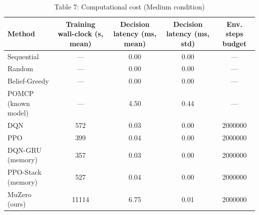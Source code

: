 \begin{table}[htbp]
\centering
\caption{Table 7: Computational cost (Medium condition)}
\begin{tabular}{lcccc}
\toprule
Method & Training wall-clock (s, mean) & Decision latency (ms, mean) & Decision latency (ms, std) & Env. steps budget \\
\midrule
Sequential & — & 0.00 & 0.00 & — \\
Random & — & 0.00 & 0.00 & — \\
Belief-Greedy & — & 0.00 & 0.00 & — \\
POMCP (known model) & — & 4.50 & 0.44 & — \\
DQN & 572 & 0.03 & 0.00 & 2000000 \\
PPO & 399 & 0.04 & 0.00 & 2000000 \\
DQN-GRU (memory) & 357 & 0.03 & 0.00 & 2000000 \\
PPO-Stack (memory) & 527 & 0.04 & 0.00 & 2000000 \\
MuZero (ours) & 11114 & 6.75 & 0.01 & 2000000 \\
\bottomrule
\end{tabular}
\end{table}
